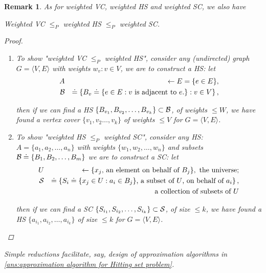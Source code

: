 \documentclass[11pt]{article}
\theoremstyle{numberplain}
\theoremstyle{nonumberplain}
\newtheorem{proof}{Proof}
\newtheorem{rem}{Remark}
\newcommand{\0}{{\mathbf{0}}}
\begin{document}
\begin{rem} As for weighted VC, weighted HS and weighted SC, we also have 
\begin{claim}
Weighted VC $\leq_P$ weighted HS $\leq_P$ weighted SC.
\label{claim:simple reductions between (weighted) VC HS SC}
\end{claim}
\begin{proof}
\begin{enumerate}
\item To show "weighted VC $\leq_P$ weighted HS", consider any (undirected) graph $G=\langle V,E\rangle$ with weights $w_v:v\in V$, we are to construct a HS: let
\begin{eqnarray*}
A&& \leftarrow E=\{e\in E\}, \\
{\cal B}&& \doteq \left\{B_v\doteq\{e\in E: v \text{ is adjacent to }e.\}:v\in V \right\},
\end{eqnarray*}

then if we can find a HS $\left\{B_{v_1},B_{v_2},\ldots,B_{v_k}\right\}\subset {\cal B}$, of weights $\leq W$, we have found a vertex cover $\{v_1,v_2\ldots,v_k\}$ of weights $\leq V$ for $G=\langle V,E\rangle$.
\item To show "weighted HS $\leq_P$ weighted SC", consider any HS: $A=\{a_1,a_2,\ldots,a_n\}$ with weights $\{w_1,w_2,\ldots,w_n\}$ and subsets ${\cal B}\doteq \left\{B_1, B_2, \ldots, B_m\right\}$ we are to construct a SC: let
\begin{eqnarray*}
U&& \leftarrow \{x_j \text{, an element on behalf of }B_j\}, \text{ the universe}; 
\\
{\cal S}&& \doteq \left\{S_i\doteq\{x_j\in U: a_i\in B_j\}
\text{, a subset of }U \text{, on behalf of }a_i
\right\},\\
&& \text{ a collection of subsets of }U
\end{eqnarray*}

then if we can find a SC $\left\{S_{i_1},S_{i_2},\ldots,S_{i_k}\right\}\subset {\cal S}$, of size $\leq k$, we have found a HS $\{a_{i_1},a_{i_2},\ldots,a_{i_k}\}$ of size $\leq k$ for $G=\langle V,E\rangle$.
\end{enumerate}
\end{proof}
Simple reductions facilitate, say, design of approximation algorithms in \ref{ans:approximation algorithm for Hitting set problem}.
\end{rem}
\end{document}
